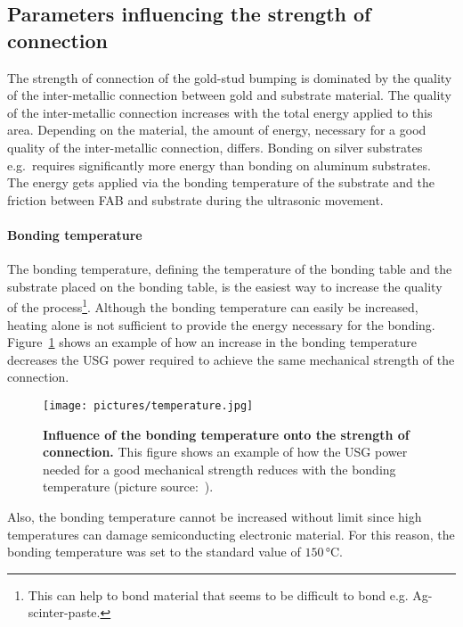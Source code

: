 \subsection{Parameters influencing the strength of connection}\label{sec:par_strength}
The strength of connection of the gold-stud bumping is dominated by the quality of the inter-metallic connection between gold and substrate material. The quality of the inter-metallic connection increases with the total energy applied to this area. Depending on the material, the amount of energy, necessary for a good quality of the inter-metallic connection, differs. Bonding on silver substrates e.g.~requires significantly more energy than bonding on aluminum substrates. The energy gets applied via the bonding temperature of the substrate and the friction between \ac{FAB} and substrate during the ultrasonic movement.

\paragraph*{Bonding temperature}
The bonding temperature, defining the temperature of the bonding table and the substrate placed on the bonding table, is the easiest way to increase the quality of the process\footnote{This can help to bond material that seems to be difficult to bond e.g. Ag-scinter-paste.}. Although the bonding temperature can easily be increased, heating alone is not sufficient to provide the energy necessary for the bonding. Figure~\ref{pic:bonding-temperature} shows an example of how an increase in the bonding temperature decreases the \ac{USG} power required to achieve the same mechanical strength of the connection.
\begin{figure}
\begin{center}
\texttt{[image: pictures/temperature.jpg]}
\end{center}
\caption[Influence of the bonding temperature onto the strength of connection]{\textbf{Influence of the bonding temperature onto the strength of connection.} This figure shows an example of how the \ac{USG} power needed for a good mechanical strength reduces with the bonding temperature (picture source:~\cite{Fal94}).}\label{pic:bonding-temperature}
\end{figure}
Also, the bonding temperature cannot be increased without limit since high temperatures can damage semiconducting electronic material. For this reason, the bonding temperature was set to the standard value of $150\,\si{\degreeCelsius}$.

